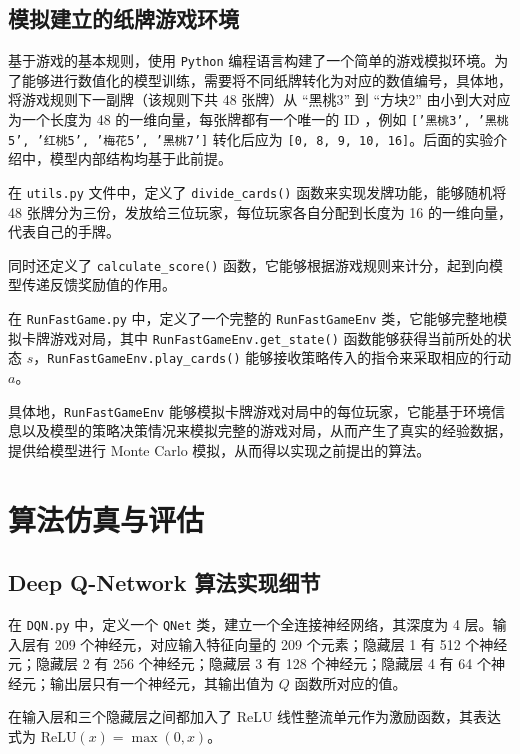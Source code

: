 \subsection{模拟建立的纸牌游戏环境}

基于游戏的基本规则，使用 \texttt{Python} 编程语言构建了一个简单的游戏模拟环境。为了能够进行数值化的模型训练，需要将不同纸牌转化为对应的数值编号，具体地，将游戏规则下一副牌（该规则下共 48 张牌）从 “黑桃3” 到 “方块2” 由小到大对应为一个长度为 48 的一维向量，每张牌都有一个唯一的 ID ，例如 \texttt{['黑桃3', '黑桃5', '红桃5', '梅花5', '黑桃7']} 转化后应为 \texttt{[0, 8, 9, 10, 16]}。后面的实验介绍中，模型内部结构均基于此前提。

在 \texttt{utils.py} 文件中，定义了 \texttt{divide\_cards()} 函数来实现发牌功能，能够随机将 48 张牌分为三份，发放给三位玩家，每位玩家各自分配到长度为 16 的一维向量，代表自己的手牌。

同时还定义了 \texttt{calculate\_score()} 函数，它能够根据游戏规则来计分，起到向模型传递反馈奖励值的作用。

在 \texttt{RunFastGame.py} 中，定义了一个完整的 \texttt{RunFastGameEnv} 类，它能够完整地模拟卡牌游戏对局，其中 \texttt{RunFastGameEnv.get\_state()} 函数能够获得当前所处的状态 $s$，\texttt{RunFastGameEnv.play\_cards()} 能够接收策略传入的指令来采取相应的行动 $a$。

具体地，\texttt{RunFastGameEnv} 能够模拟卡牌游戏对局中的每位玩家，它能基于环境信息以及模型的策略决策情况来模拟完整的游戏对局，从而产生了真实的经验数据，提供给模型进行 Monte Carlo 模拟，从而得以实现之前提出的算法。

\section{算法仿真与评估}

\subsection{Deep Q-Network 算法实现细节}

在 \texttt{DQN.py} 中，定义一个 \texttt{QNet} 类，建立一个全连接神经网络，其深度为 4 层。输入层有 209 个神经元，对应输入特征向量的 209 个元素；隐藏层 1 有 512 个神经元；隐藏层 2 有 256 个神经元；隐藏层 3 有 128 个神经元；隐藏层 4 有 64 个神经元；输出层只有一个神经元，其输出值为 $Q$ 函数所对应的值。

在输入层和三个隐藏层之间都加入了 ReLU 线性整流单元\cite{li2017convergence}作为激励函数，其表达式为 $\mathrm{ReLU}(x) = \max(0,x)$。

